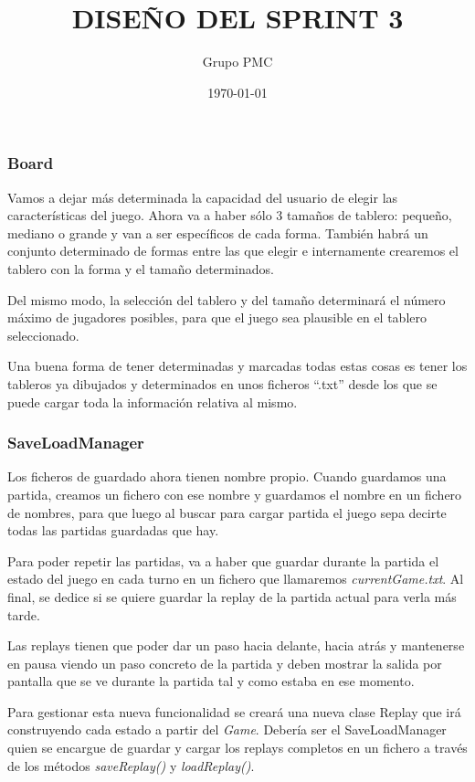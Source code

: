 \documentclass{article}
\title{DISEÑO DEL SPRINT 3}
\date{\today}
\author{Grupo PMC}
\begin{document}
\maketitle

\subsubsection*{Board}
Vamos a dejar más determinada la capacidad del usuario de elegir las características del juego. Ahora va a haber sólo 3 tamaños de tablero: pequeño, mediano o grande y van a ser específicos de cada forma. También habrá un conjunto determinado de formas entre las que elegir e internamente crearemos el tablero con la forma y el tamaño determinados.

Del mismo modo, la selección del tablero y del tamaño determinará el número máximo de jugadores posibles, para que el juego sea plausible en el tablero seleccionado.

Una buena forma de tener determinadas y marcadas todas estas cosas es tener los tableros ya dibujados y determinados en unos ficheros ``.txt'' desde los que se puede cargar toda la información relativa al mismo.

\subsubsection*{SaveLoadManager}
Los ficheros de guardado ahora tienen nombre propio. Cuando guardamos una partida, creamos un fichero con ese nombre y guardamos el nombre en un fichero de nombres, para que luego al buscar para cargar partida el juego sepa decirte todas las partidas guardadas que hay.

Para poder repetir las partidas, va a haber que guardar durante la partida el estado del juego en cada turno en un fichero que llamaremos \textit{currentGame.txt}. Al final, se dedice si se quiere guardar la replay de la partida actual para verla más tarde.

Las replays tienen que poder dar un paso hacia delante, hacia atrás y mantenerse en pausa viendo un paso concreto de la partida y deben mostrar la salida por pantalla que se ve durante la partida tal y como estaba en ese momento.

Para gestionar esta nueva funcionalidad se creará una nueva clase Replay que irá construyendo cada estado a partir del \textit{Game}. Debería ser el SaveLoadManager quien se encargue de guardar y cargar los replays completos en un fichero a través de los métodos \textit{saveReplay()} y \textit{loadReplay()}.
\end{document}

